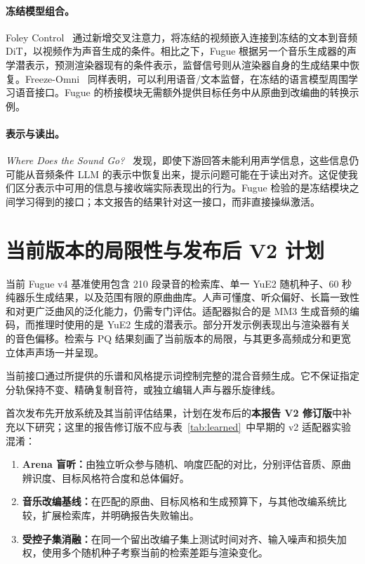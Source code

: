 \documentclass[11pt,a4paper,fontset=fandol]{ctexart}
\begin{document}
\paragraph{冻结模型组合。}Foley Control~\cite{foleycontrol} 通过新增交叉注意力，将冻结的视频嵌入连接到冻结的文本到音频 DiT，以视频作为声音生成的条件。相比之下，Fugue 根据另一个音乐生成器的声学潜表示，预测渲染器现有的条件表示，监督信号则从渲染器自身的生成结果中恢复。Freeze-Omni~\cite{freezeomni} 同样表明，可以利用语音/文本监督，在冻结的语言模型周围学习语音接口。Fugue 的桥接模块无需额外提供目标任务中从原曲到改编曲的转换示例。

\paragraph{表示与读出。}\emph{Where Does the Sound Go?}~\cite{soundgo} 发现，即使下游回答未能利用声学信息，这些信息仍可能从音频条件 LLM 的表示中恢复出来，提示问题可能在于读出对齐。这促使我们区分表示中可用的信息与接收端实际表现出的行为。Fugue 检验的是冻结模块之间学习得到的接口；本文报告的结果针对这一接口，而非直接操纵激活。

\section{当前版本的局限性与发布后 V2 计划}

当前 Fugue v4 基准使用包含 210 段录音的检索库、单一 YuE2 随机种子、60 秒纯器乐生成结果，以及范围有限的原曲曲库。人声可懂度、听众偏好、长篇一致性和对更广泛曲风的泛化能力，仍需专门评估。适配器拟合的是 MM3 生成音频的编码，而推理时使用的是 YuE2 生成的潜表示。部分开发示例表现出与渲染器有关的音色偏移。检索与 PQ 结果刻画了当前版本的局限，与其更多高频成分和更宽立体声声场一并呈现。

当前接口通过所提供的乐谱和风格提示词控制完整的混合音频生成。它不保证指定分轨保持不变、精确复制音符，或独立编辑人声与器乐旋律线。

首次发布先开放系统及其当前评估结果，计划在发布后的\textbf{本报告 V2 修订版}中补充以下研究；这里的报告修订版不应与表~\ref{tab:learned}~中早期的 v2 适配器实验混淆：

\begin{enumerate}[leftmargin=2em,itemsep=0.25em]
    \item \textbf{Arena 盲听：}由独立听众参与随机、响度匹配的对比，分别评估音质、原曲辨识度、目标风格符合度和总体偏好。
    \item \textbf{音乐改编基线：}在匹配的原曲、目标风格和生成预算下，与其他改编系统比较，扩展检索库，并明确报告失败输出。
    \item \textbf{受控子集消融：}在同一个留出改编子集上测试时间对齐、输入噪声和损失加权，使用多个随机种子考察当前的检索差距与渲染变化。
\end{enumerate}
\end{document}
